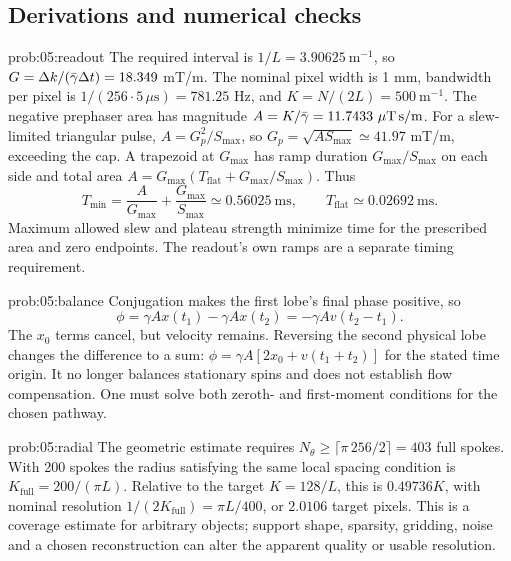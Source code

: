 \subsection{Derivations and numerical checks}
\begin{solution}{prob:05:readout}
The required interval is \(1/L=3.90625\ \mathrm m^{-1}\), so
\(G=\Delta k/(\bar{\gamma}\Delta t)=18.349\) mT/m.
The nominal pixel width is 1 mm, bandwidth per pixel is
\(1/(256\cdot5\,\mu\mathrm s)=781.25\) Hz, and
\(K=N/(2L)=500\ \mathrm m^{-1}\).
The negative prephaser area has magnitude
\(A=K/\bar{\gamma}=11.7433\ \mathrm{\mu T\,s/m}\).
For a slew-limited triangular pulse, \(A=G_p^2/S_{\max}\), so
\(G_p=\sqrt{AS_{\max}}\simeq41.97\) mT/m, exceeding the cap.
A trapezoid at \(G_{\max}\) has ramp duration \(G_{\max}/S_{\max}\) on each side and total area
\(A=G_{\max}(T_{\mathrm{flat}}+G_{\max}/S_{\max})\).
Thus
\[
 T_{\min}=\frac{A}{G_{\max}}+\frac{G_{\max}}{S_{\max}}
 \simeq0.56025\ \mathrm{ms},
 \qquad T_{\mathrm{flat}}\simeq0.02692\ \mathrm{ms}.
\]
Maximum allowed slew and plateau strength minimize time for the prescribed area and zero endpoints. The readout's own ramps are a separate timing requirement.
\end{solution}
\begin{solution}{prob:05:balance}
Conjugation makes the first lobe's final phase positive, so
\[
 \phi=\gamma A x(t_1)-\gamma A x(t_2)
      =-\gamma A v(t_2-t_1).
\]
The \(x_0\) terms cancel, but velocity remains. Reversing the second physical lobe changes the difference to a sum:
\(\phi=\gamma A[2x_0+v(t_1+t_2)]\) for the stated time origin.
It no longer balances stationary spins and does not establish flow compensation. One must solve both zeroth- and first-moment conditions for the chosen pathway.
\end{solution}
\begin{solution}{prob:05:radial}
The geometric estimate requires
\(N_\theta\geq\lceil\pi\,256/2\rceil=403\) full spokes.
With 200 spokes the radius satisfying the same local spacing condition is
\(K_{\mathrm{full}}=200/(\pi L)\).
Relative to the target \(K=128/L\), this is \(0.49736K\), with nominal resolution
\(1/(2K_{\mathrm{full}})=\pi L/400\), or \(2.0106\) target pixels.
This is a coverage estimate for arbitrary objects; support shape, sparsity, gridding, noise and a chosen reconstruction can alter the apparent quality or usable resolution.
\end{solution}
